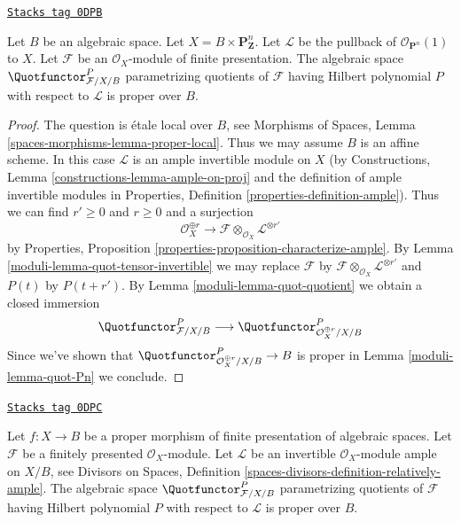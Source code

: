 \begin{lemma}
\label{moduli-lemma-quot-Pn-over-base}
\href{https://stacks.math.columbia.edu/tag/0DPB}{\texttt{Stacks tag 0DPB}}

Let $B$ be an algebraic space. Let $X = B \times \mathbf{P}^n_\mathbf{Z}$.
Let $\mathcal{L}$ be the pullback of $\mathcal{O}_{\mathbf{P}^n}(1)$ to $X$.
Let $\mathcal{F}$ be an $\mathcal{O}_X$-module of finite
presentation. The algebraic space $\Quotfunctor^P_{\mathcal{F}/X/B}$
parametrizing quotients of $\mathcal{F}$
having Hilbert polynomial $P$ with respect to $\mathcal{L}$
is proper over $B$.
\end{lemma}

\begin{proof}

The question is \'etale local over $B$, see
Morphisms of Spaces, Lemma \ref{spaces-morphisms-lemma-proper-local}.
Thus we may assume $B$ is an affine scheme.
In this case $\mathcal{L}$ is an ample invertible module on $X$
(by Constructions, Lemma \ref{constructions-lemma-ample-on-proj}
and the definition of ample invertible modules in
Properties, Definition \ref{properties-definition-ample}).
Thus we can find $r' \geq 0$ and $r \geq 0$ and a surjection
$$
\mathcal{O}_X^{\oplus r} \longrightarrow
\mathcal{F} \otimes_{\mathcal{O}_X} \mathcal{L}^{\otimes r'}
$$
by Properties, Proposition \ref{properties-proposition-characterize-ample}.
By Lemma \ref{moduli-lemma-quot-tensor-invertible}
we may replace $\mathcal{F}$ by
$\mathcal{F} \otimes_{\mathcal{O}_X} \mathcal{L}^{\otimes r'}$
and $P(t)$ by $P(t + r')$.
By Lemma \ref{moduli-lemma-quot-quotient}
we obtain a closed immersion
$$
\Quotfunctor^P_{\mathcal{F}/X/B}
\longrightarrow
\Quotfunctor^P_{\mathcal{O}_X^{\oplus r}/X/B}
$$
Since we've shown that $\Quotfunctor^P_{\mathcal{O}_X^{\oplus r}/X/B} \to B$
is proper in Lemma \ref{moduli-lemma-quot-Pn} we conclude.
\end{proof}

\begin{lemma}
\label{moduli-lemma-quot-proper-over-base}
\href{https://stacks.math.columbia.edu/tag/0DPC}{\texttt{Stacks tag 0DPC}}

Let $f : X \to B$ be a proper morphism of finite presentation
of algebraic spaces. Let $\mathcal{F}$ be a finitely presented
$\mathcal{O}_X$-module. Let $\mathcal{L}$ be an invertible
$\mathcal{O}_X$-module ample on $X/B$, see
Divisors on Spaces, Definition
\ref{spaces-divisors-definition-relatively-ample}.
The algebraic space $\Quotfunctor^P_{\mathcal{F}/X/B}$
parametrizing quotients of $\mathcal{F}$
having Hilbert polynomial $P$ with respect to $\mathcal{L}$
is proper over $B$.
\end{lemma}

